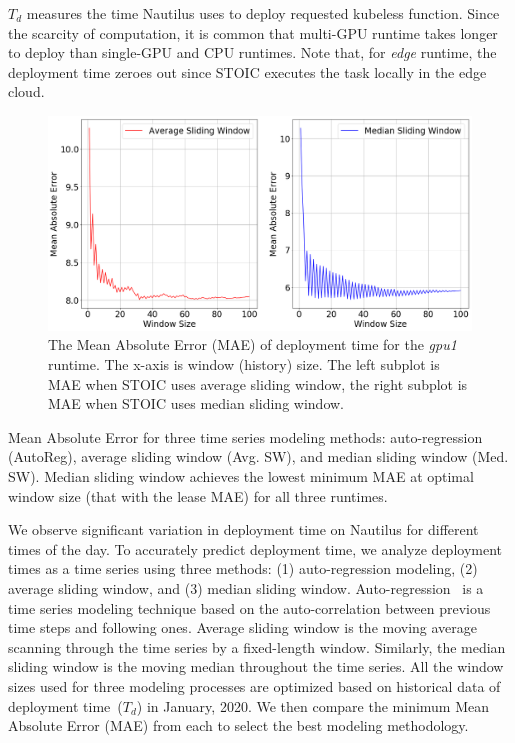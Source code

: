 $T_d$ measures the time
Nautilus uses to deploy requested kubeless function. Since the scarcity of
computation, it is common that multi-GPU runtime takes longer to deploy than
single-GPU and CPU runtimes. Note that, for \textit{edge} runtime, the
deployment time zeroes out since STOIC executes the task locally in the edge
cloud.
 
\begin{figure}
    \centering
    \includegraphics[scale=0.3]{figures/deployment}
    \caption{The Mean Absolute Error (MAE) of deployment time for the \textit{gpu1} runtime. The x-axis is window (history) size. The left subplot is MAE when STOIC uses average sliding window, the right subplot is MAE when STOIC uses median sliding window.
\label{fig:deployment}}
\end{figure}

 
\begin{table}
\centering

\caption{Mean Absolute Error for three time series modeling methods: auto-regression (AutoReg), average sliding window (Avg. SW), and median sliding window (Med. SW). Median sliding window achieves the lowest minimum MAE at optimal window size (that with the lease MAE) for all three runtimes. \label{tab:deployment}}
\end{table}
 

We observe significant variation in deployment time on Nautilus for different
times of the day. To accurately predict deployment time, we analyze deployment
times as a time series using three methods: (1) auto-regression modeling, (2)
average sliding window, and (3) median sliding window.
Auto-regression~\cite{ref:autoreg} is a time series modeling technique based
on the auto-correlation between previous time steps and following ones.
Average sliding window is the moving average~\cite{ref:moveavg} scanning
through the time series by a fixed-length window. Similarly, the median
sliding window is the moving median throughout the time series. All the window
sizes used for three modeling processes are optimized based on historical data
of deployment time~($T_d$) in January, 2020. We then compare the minimum Mean
Absolute Error (MAE) from each to select the best modeling methodology. 

